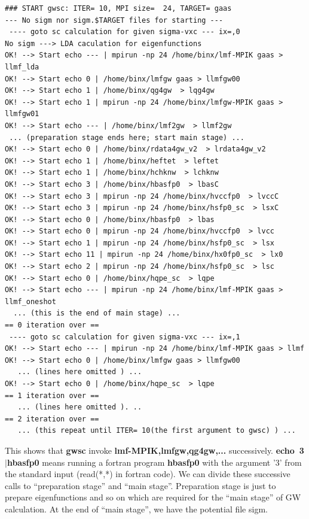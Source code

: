\documentclass[a4paper,10pt,epsf,fleqn]{article}
\newcommand{\exe}[1]{{\bf #1}}
\newcommand{\io}[1]{{\sf  #1}}
\begin{document}
{\baselineskip=2mm
\begin{verbatim}
### START gwsc: ITER= 10, MPI size=  24, TARGET= gaas
--- No sigm nor sigm.$TARGET files for starting ---
 ---- goto sc calculation for given sigma-vxc --- ix=,0
No sigm ---> LDA caculation for eigenfunctions 
OK! --> Start echo --- | mpirun -np 24 /home/binx/lmf-MPIK gaas > llmf_lda 
OK! --> Start echo 0 | /home/binx/lmfgw gaas > llmfgw00 
OK! --> Start echo 1 | /home/binx/qg4gw  > lqg4gw 
OK! --> Start echo 1 | mpirun -np 24 /home/binx/lmfgw-MPIK gaas > llmfgw01 
OK! --> Start echo --- | /home/binx/lmf2gw  > llmf2gw 
 ... (preparation stage ends here; start main stage) ...
OK! --> Start echo 0 | /home/binx/rdata4gw_v2  > lrdata4gw_v2 
OK! --> Start echo 1 | /home/binx/heftet  > leftet 
OK! --> Start echo 1 | /home/binx/hchknw  > lchknw 
OK! --> Start echo 3 | /home/binx/hbasfp0  > lbasC 
OK! --> Start echo 3 | mpirun -np 24 /home/binx/hvccfp0  > lvccC 
OK! --> Start echo 3 | mpirun -np 24 /home/binx/hsfp0_sc  > lsxC 
OK! --> Start echo 0 | /home/binx/hbasfp0  > lbas 
OK! --> Start echo 0 | mpirun -np 24 /home/binx/hvccfp0  > lvcc 
OK! --> Start echo 1 | mpirun -np 24 /home/binx/hsfp0_sc  > lsx 
OK! --> Start echo 11 | mpirun -np 24 /home/binx/hx0fp0_sc  > lx0 
OK! --> Start echo 2 | mpirun -np 24 /home/binx/hsfp0_sc  > lsc 
OK! --> Start echo 0 | /home/binx/hqpe_sc  > lqpe 
OK! --> Start echo --- | mpirun -np 24 /home/binx/lmf-MPIK gaas > llmf_oneshot 
  ... (this is the end of main stage) ...
== 0 iteration over ==
 ---- goto sc calculation for given sigma-vxc --- ix=,1
OK! --> Start echo --- | mpirun -np 24 /home/binx/lmf-MPIK gaas > llmf 
OK! --> Start echo 0 | /home/binx/lmfgw gaas > llmfgw00 
   ... (lines here omitted ) ...
OK! --> Start echo 0 | /home/binx/hqpe_sc  > lqpe 
== 1 iteration over ==
   ... (lines here omitted ). ..
== 2 iteration over ==
   ... (this repeat until ITER= 10(the first argument to gwsc) ) ...
\end{verbatim}
}
This shows that \exe{gwsc} invoke \exe{lmf-MPIK,lmfgw,qg4gw,...} successively.
\exe{echo~3$|$hbasfp0 } means running a fortran program \exe{hbasfp0} 
with the argument '3' from the standard input (\io{read(*,*)} in fortran
code).
We can divide these successive calls to ``preparation stage'' and ``main
stage''. Preparation stage is just to prepare eigenfunctions and so on 
which are required for the ``main stage'' of GW calculation.
At the end of ``main stage'', we have the potential file \io{sigm}.
\end{document}

